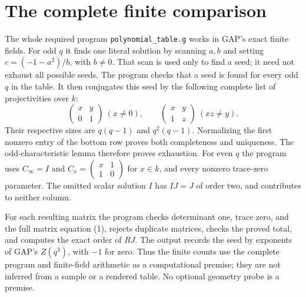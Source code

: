 \documentclass[11pt,a4paper]{article}
\begin{document}
\section*{The complete finite comparison}
The whole required program \texttt{polynomial\_table.g} works in GAP's
exact finite fields. For odd $q$ it finds one literal solution by scanning
$a,b$ and setting $c=(-1-a^2)/b$, with $b\ne0$. That scan is used only
to find a seed; it need not exhaust all possible seeds. The program checks
that a seed is found for every odd $q$ in the table. It then conjugates
this seed by the following complete list of projectivities over $k$:
\[
 \begin{pmatrix}x&y\\0&1\end{pmatrix}\ (x\ne0),\qquad
 \begin{pmatrix}x&y\\1&z\end{pmatrix}\ (xz\ne y).
\]
Their respective sizes are $q(q-1)$ and $q^2(q-1)$. Normalizing the
first nonzero entry of the bottom row proves both completeness and
uniqueness. The odd-characteristic lemma therefore proves exhaustion.
For even $q$ the program uses $C_\infty=I$ and
$C_x=\left(\begin{smallmatrix}x&1\\1&0\end{smallmatrix}\right)$
for $x\in k$, and every nonzero trace-zero parameter. The omitted scalar
solution $I$ has $IJ=J$ of order two, and contributes to neither column.

For each resulting matrix the program checks determinant one, trace zero,
and the full matrix equation (1), rejects duplicate matrices, checks the
proved total, and computes the exact order of $RJ$. The output records the
seed by exponents of GAP's $Z(q^3)$, with $-1$ for zero. Thus the finite
counts use the complete program and finite-field arithmetic as a
computational premise; they are not inferred from a sample or a rendered
table. No optional geometry probe is a premise.
\end{document}
